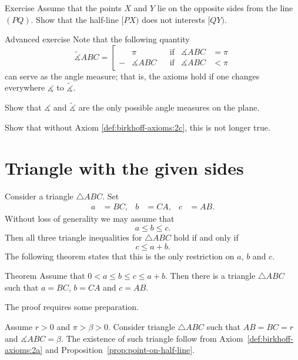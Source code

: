 \begin{thm}{Exercise}\label{ex:Z}
Assume that the points $X$ and $Y$ lie on the opposite sides from the line $(PQ)$.
Show that the half-line $[PX)$ does not interests $[QY)$. 
\end{thm}

\begin{thm}{Advanced exercise}\label{ex:angle-measures}
Note that the following quantity 
$$\tilde\measuredangle ABC=\left[
\begin{aligned}
&\pi&&\text{if}&\measuredangle ABC&=\pi
\\
-&\measuredangle ABC&&\text{if}&\measuredangle ABC&<\pi
\end{aligned}
\right.$$
can serve as the angle measure; 
that is, the axioms hold if one changes everywhere $\measuredangle$ to $\tilde\measuredangle$.

Show that $\measuredangle$ and $\tilde\measuredangle$ are the only possible angle measures on the plane. 

Show that without Axiom \ref{def:birkhoff-axioms:2c}, this is not longer true.
\end{thm}
 


\section*{Triangle with the given sides}

Consider a triangle $\triangle ABC$.
Set 
\begin{align*}
a&=BC,
&
b&=CA,
&
c&=AB.
\end{align*}
Without loss of generality we may assume that 
\[a\le b \le c.\]
Then all three triangle inequalities for $\triangle ABC$
hold if and only if 
\[c\le a+b.\]
The following theorem states that this is the only restriction on $a$, $b$ and $c$.

\begin{thm}{Theorem}\label{thm:abc}
Assume that $0<a\le b\le c\le a+b$.
Then there is a triangle $\triangle ABC$ such that $a=BC$, $b=CA$ and $c=AB$.
\end{thm}

The proof requires some preparation.

Assume $r>0$ and $\pi>\beta>0$.
Consider triangle $\triangle ABC$ such that 
$AB=BC=r$ and $\measuredangle ABC=\beta$.
The existence of such triangle follow from Axiom~\ref{def:birkhoff-axioms:2a} and Proposition~\ref{prop:point-on-half-line}.


